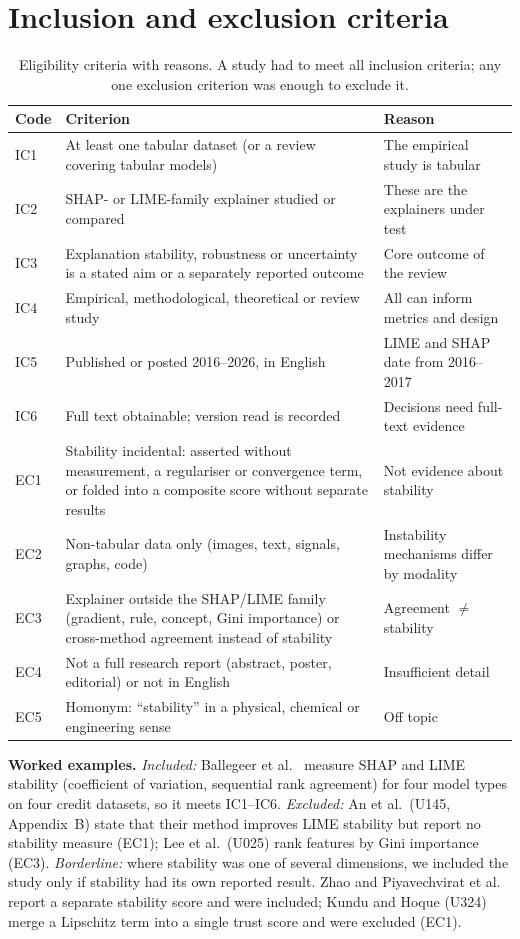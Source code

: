 \section{Inclusion and exclusion criteria}
\begin{table}[!htb]
\centering\small
\caption{Eligibility criteria with reasons. A study had to meet all inclusion criteria; any one exclusion criterion was enough to exclude it.}\label{tab:criteria}
\begin{tabularx}{\textwidth}{@{}P{0.9cm}P{6.6cm}L@{}}
\toprule
Code & Criterion & Reason \\ \midrule
IC1 & At least one tabular dataset (or a review covering tabular models) & The empirical study is tabular \\
IC2 & SHAP- or LIME-family explainer studied or compared & These are the explainers under test \\
IC3 & Explanation stability, robustness or uncertainty is a stated aim or a separately reported outcome & Core outcome of the review \\
IC4 & Empirical, methodological, theoretical or review study & All can inform metrics and design \\
IC5 & Published or posted 2016--2026, in English & LIME and SHAP date from 2016--2017 \\
IC6 & Full text obtainable; version read is recorded & Decisions need full-text evidence \\ \midrule
EC1 & Stability incidental: asserted without measurement, a regulariser or convergence term, or folded into a composite score without separate results & Not evidence about stability \\
EC2 & Non-tabular data only (images, text, signals, graphs, code) & Instability mechanisms differ by modality \\
EC3 & Explainer outside the SHAP/LIME family (gradient, rule, concept, Gini importance) or cross-method agreement instead of stability & Agreement $\neq$ stability \\
EC4 & Not a full research report (abstract, poster, editorial) or not in English & Insufficient detail \\
EC5 & Homonym: ``stability'' in a physical, chemical or engineering sense & Off topic \\
\bottomrule
\end{tabularx}
\end{table}
\textbf{Worked examples.} \textit{Included:} Ballegeer et al.\ \cite{S29} measure SHAP and LIME stability (coefficient of variation, sequential rank agreement) for four model types on four credit datasets, so it meets IC1--IC6. \textit{Excluded:} An et al.\ (U145, Appendix~B) state that their method improves LIME stability but report no stability measure (EC1); Lee et al.\ (U025) rank features by Gini importance (EC3). \textit{Borderline:} where stability was one of several dimensions, we included the study only if stability had its own reported result. Zhao \cite{S69} and Piyavechvirat et al.\ \cite{S57} report a separate stability score and were included; Kundu and Hoque (U324) merge a Lipschitz term into a single trust score and were excluded (EC1).

